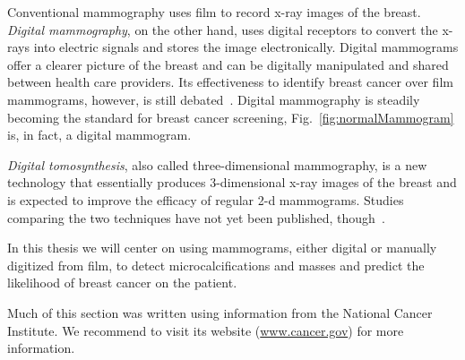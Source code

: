 Conventional mammography uses film to record x-ray images of the breast. \emph{Digital mammography}, on the other hand, uses digital receptors to convert the x-rays into electric signals and stores the image electronically. Digital mammograms offer a clearer picture of the breast and can be digitally manipulated and shared between health care providers. Its effectiveness to identify breast cancer over film mammograms, however, is still debated~\cite{Kerlikowske2011, Pisano2008, Skaane2007}. Digital mammography is steadily becoming the standard for breast cancer screening, Fig.~\ref{fig:normalMammogram} is, in fact, a digital mammogram.

\emph{Digital tomosynthesis}, also called three-dimensional mammography, is a new technology that essentially produces 3-dimensional x-ray images of the breast and is expected to improve the efficacy of regular 2-d mammograms. Studies comparing the two techniques have not yet been published, though~\cite{Mammograms2014}.

In this thesis we will center on using mammograms, either digital or manually digitized from film, to detect microcalcifications and masses and predict the likelihood of breast cancer on the patient.

Much of this section was written using information from the National Cancer Institute. We recommend to visit its website (\url{www.cancer.gov}) for more information.
